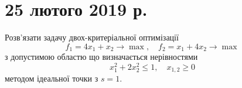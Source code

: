\section*{25 лютого 2019 р.}

\setcounter{problem}{0}




    

\begin{problem}
    Розв'язати задачу двох-критеріальної оптимізації \[ f_1 = 4 x_1 + x_2 \to \max, \quad f_2 = x_1 + 4 x_2 \to \max \] з допустимою областю що визначається нерівностями \[ x_1^2 + 2 x_2^2 \le 1, \quad x_{1, 2} \ge 0 \] методом ідеальної точки з $s = 1$.
\end{problem}

